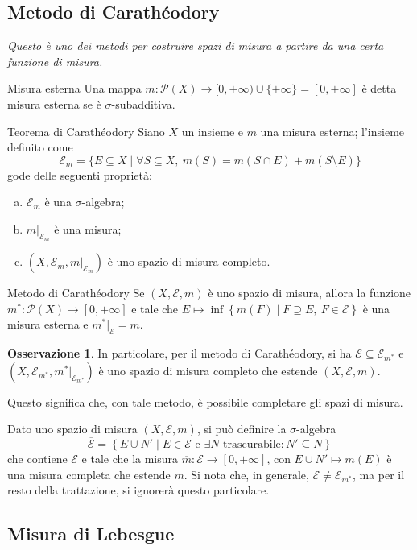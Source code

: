 \documentclass[11pt, a4paper]{scrartcl}
\theoremstyle{definition}
\numberwithin{esempio}{section}
\theoremstyle{definition}
\newtheorem{obs}{Osservazione}
\numberwithin{obs}{section}
\numberwithin{nota}{section}
\numberwithin{equation}{subsection}
\begin{document}
\subsection{Metodo di Carath\'eodory}
\begin{center}
	\textit{Questo \`e uno dei metodi per costruire spazi di misura a partire da una certa funzione di misura.}
\end{center}
\begin{definizione}
	{Misura esterna}{}
	Una mappa $m : \mathcal{P} (X) \to [0,+\infty) \cup \{+\infty\} = [0,+\infty]$ \`e detta misura esterna se \`e $\sigma $-subadditiva.
\end{definizione}
\begin{teorema}
	{Teorema di Carath\'eodory}{}
	Siano $X$ un insieme e $m$ una misura esterna; l'insieme definito come
	\[
	\mathcal{E} _m = \big\{ E\subseteq X  \mid \forall S \subseteq X , \ m(S) = m(S\cap E) + m(S\setminus E) \big\} 
	\] 
	gode delle seguenti propriet\`a:
	\begin{enumerate}[(a).]
		\item $\mathcal{E} _m$ \`e una $\sigma $-algebra;
		\item $m | _{\mathcal{E} _m} $ \`e una misura;
		\item $(X,\mathcal{E} _m, m | _{\mathcal{E} _m} )$ \`e uno spazio di misura completo.
	\end{enumerate}
\end{teorema}
\begin{teorema}
	{Metodo di Carath\'eodory}{}
	Se $(X,\mathcal{E} ,m)$ \`e uno spazio di misura, allora la funzione $m^*:\mathcal{P} (X) \to [0,+\infty]$ e tale che $E\longmapsto \inf\left\{ m(F)  \mid F \supseteq E, \ F \in \mathcal{E}  \right\} $ \`e una misura esterna e $m^*|_{\mathcal{E} } = m$.
\end{teorema}
\begin{obs}
In particolare, per il metodo di Carath\'eodory, si ha $\mathcal{E} \subseteq \mathcal{E} _{m^*} $ e $(X,\mathcal{E} _{m^*} , m^*|_{\mathcal{E} _{m^*} } )$ \`e uno spazio di misura completo che estende $(X,\mathcal{E},m )$.

Questo significa che, con tale metodo, \`e possibile completare gli spazi di misura.
\end{obs}
\noindent Dato uno spazio di misura $(X,\mathcal{E} ,m)$, si pu\`o definire la $\sigma $-algebra
\[
	\overline{\mathcal{E} }=\left\{ E \cup N'  \mid E \in \mathcal{E} \text{ e } \exists N \text{ trascurabile} :N'\subseteq N \right\} 
\] 
che contiene $\mathcal{E} $ e tale che la misura $\overline{m}: \overline{\mathcal{E} }\to[0,+\infty]$, con $E \cup N' \longmapsto m(E)$ \`e una misura completa che estende $m$.
Si nota che, in generale, $\overline{\mathcal{E} }\neq \mathcal{E} _{m^*} $, ma per il resto della trattazione, si ignorer\`a questo particolare.
\subsection{Misura di Lebesgue}
\end{document}
